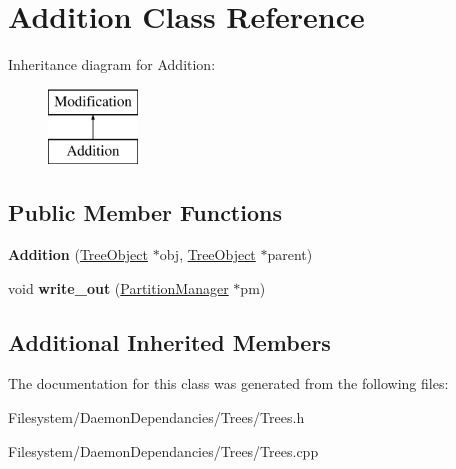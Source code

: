\hypertarget{classAddition}{}\section{Addition Class Reference}
\label{classAddition}
Inheritance diagram for Addition\+:\begin{figure}[H]
\begin{center}
\leavevmode
\includegraphics[height=2.000000cm]{d4/d72/classAddition}
\end{center}
\end{figure}
\subsection*{Public Member Functions}
\begin{DoxyCompactItemize}
\item 
\mbox{\label{classAddition_a0bcd6cd605c0e90a834339a1feb20901}} 
{\bfseries Addition} (\mbox{\hyperlink{classTreeObject}{Tree\+Object}} $\ast$obj, \mbox{\hyperlink{classTreeObject}{Tree\+Object}} $\ast$parent)
\item 
\mbox{\label{classAddition_a08cd2dae96a62c80d6fe62339232fbca}} 
void {\bfseries write\+\_\+out} (\mbox{\hyperlink{classPartitionManager}{Partition\+Manager}} $\ast$pm)
\end{DoxyCompactItemize}
\subsection*{Additional Inherited Members}


The documentation for this class was generated from the following files\+:\begin{DoxyCompactItemize}
\item 
Filesystem/\+Daemon\+Dependancies/\+Trees/Trees.\+h\item 
Filesystem/\+Daemon\+Dependancies/\+Trees/Trees.\+cpp\end{DoxyCompactItemize}

